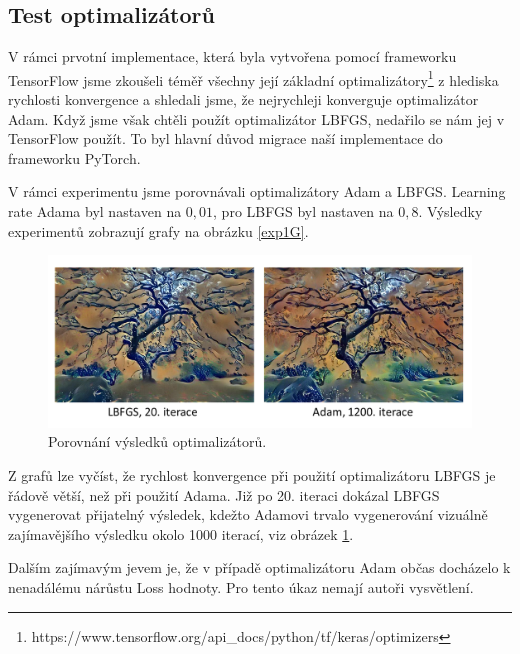 \documentclass[twocolumn]{article}
\begin{document}
	\subsection*{Test optimalizátorů}
	V rámci prvotní implementace, která byla vytvořena pomocí frameworku TensorFlow jsme zkoušeli téměř všechny její základní optimalizátory\footnote{https://www.tensorflow.org/api\_docs/python/tf/keras/optimizers} z hlediska rychlosti konvergence a shledali jsme, že nejrychleji konverguje optimalizátor Adam. Když jsme však chtěli použít optimalizátor LBFGS, nedařilo se nám jej v TensorFlow použít. To byl hlavní důvod migrace naší implementace do frameworku PyTorch.
	\par
	V rámci experimentu jsme porovnávali optimalizátory Adam a LBFGS. Learning rate Adama byl nastaven na $0,01$, pro LBFGS byl nastaven na $0,8$. Výsledky experimentů zobrazují grafy na obrázku \ref{exp1G}.
	
	\begin{figure}[h]
		\includegraphics[width=\linewidth]{LBFGS_ADAM_iterace.png}
		\caption{Porovnání výsledků optimalizátorů. }
		\label{Exp1O}
	\end{figure}
	
	

	Z grafů lze vyčíst, že rychlost konvergence při použití optimalizátoru LBFGS je řádově větší, než při použití Adama. Již po 20. iteraci dokázal LBFGS vygenerovat přijatelný výsledek, kdežto Adamovi trvalo vygenerování vizuálně zajímavějšího výsledku okolo 1000 iterací, viz obrázek \ref{Exp1O}.

	Dalším zajímavým jevem je, že v případě optimalizátoru Adam občas docházelo k nenadálému nárůstu Loss hodnoty. Pro tento úkaz nemají autoři vysvětlení.
	
\end{document}
